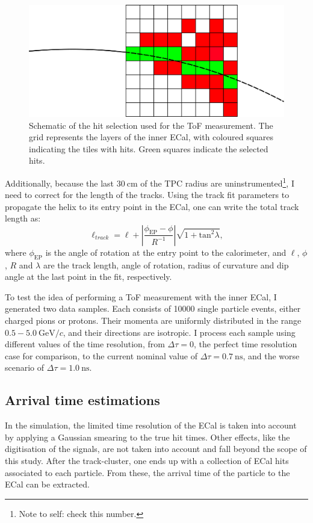\begin{figure}[t]
	\centering
	\includegraphics[width=.75\linewidth]{Images/GArSoft_PID/tof/tof_diagram.png}
	\caption{Schematic of the hit selection used for the ToF measurement. The grid represents the layers of the inner ECal, with coloured squares indicating the tiles with hits. Green squares indicate the selected hits.}
	\label{fig:tof_diagram}
\end{figure}

Additionally, because the last $30~\mathrm{cm}$ of the TPC radius are uninstrumented\footnote{Note to self: check this number.}, I need to correct for the length of the tracks. Using the track fit parameters to propagate the helix to its entry point in the ECal, one can write the total track length as:
\begin{equation}
	\ell_{track} = \ell + \left| \frac{\phi_{\mathrm{EP}} - \phi}{R^{-1}} \right| \sqrt{1+\mathrm{tan}^{2}\lambda},
\end{equation}
where $\phi_{\mathrm{EP}}$ is the angle of rotation at the entry point to the calorimeter, and $\ell$, $\phi$, $R$ and $\lambda$ are the track length, angle of rotation, radius of curvature and dip angle at the last point in the fit, respectively.

To test the idea of performing a ToF measurement with the inner ECal, I generated two data samples. Each consists of 10000 single particle events, either charged pions or protons. Their momenta are uniformly distributed in the range $0.5-5.0~\mathrm{GeV}/c$, and their directions are isotropic. I process each sample using different values of the time resolution, from $\Delta \tau = 0$, the perfect time resolution case for comparison, to the current nominal value of $\Delta \tau = 0.7~\mathrm{ns}$, and the worse scenario of $\Delta \tau = 1.0~\mathrm{ns}$.

\subsection{Arrival time estimations}

In the simulation, the limited time resolution of the ECal is taken into account by applying a Gaussian smearing to the true hit times. Other effects, like the digitisation of the signals, are not taken into account and fall beyond the scope of this study. After the track-cluster, one ends up with a collection of ECal hits associated to each particle. From these, the arrival time of the particle to the ECal can be extracted.

